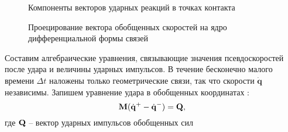 %

\begin{figure}[h]
        \centering
        \caption{Компоненты векторов ударных реакций в точках контакта}
        \label{fig:react}
    \endminipage
        \centering
        \caption{Проецирование вектора обобщенных скоростей на ядро дифференциальной формы связей}
        \label{fig:project}
    \endminipage
\end{figure}

Составим алгебраические уравнения, связывающие значения псевдоскоростей после удара и величины ударных импульсов. В течение бесконечно малого времени $\Delta t$ наложены только геометрические связи, так что скорости $\dot{\mathbf{q}}$ независимы. Запишем уравнение удара в обобщенных координатах \cite{Vilke}:
\begin{equation}\label{eq:udar_general}
\mathbf{M} (\dot{\mathbf{q}}^+ - \dot{\mathbf{q}}^-) = \mathbf{Q},
\end{equation}
где $\mathbf{Q}$ -- вектор ударных импульсов обобщенных сил

